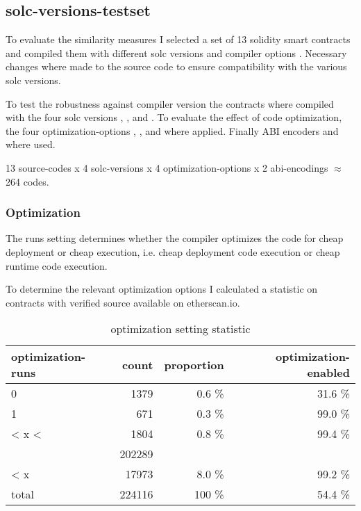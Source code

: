 \documentclass[../main.tex]{subfiles}
\begin{document}
\subsection{solc-versions-testset}
To evaluate the similarity measures I selected a set of 13 solidity smart contracts and compiled
them with different solc versions and compiler options .
Necessary changes where made to the source code to ensure compatibility with the various solc
versions.

To test the robustness against compiler version the contracts where compiled with the four solc versions , ,  and .
To evaluate the effect of code optimization, the four optimization-options , ,  and  where applied.
Finally ABI encoders  and  where used.

13 source-codes x 4 solc-versions x 4 optimization-options x 2 abi-encodings \(\approx\) 264 codes.

\subsubsection{Optimization}
The runs setting determines whether the compiler optimizes the code for cheap deployment or cheap execution, i.e. cheap deployment code execution or cheap runtime code execution.

To determine the relevant optimization options I calculated a statistic  on contracts with verified source available on etherscan.io.

\begin{table*}[ht]
  \centering
  \begin{tabular}{lrrr}
    optimization-runs & count  & proportion           & optimization-enabled \\
    \hline
    0                 & 1379   & 0.6 \%               & 31.6 \%              \\
    1                 & 671    & 0.3 \%               & 99.0 \%              \\
    < x <             & 1804   & 0.8 \%               & 99.4 \%              \\
    \color{red}{200}  & 202289 & \color{red}{90.3 \%} & \color{red}{50.0 \%} \\
    < x               & 17973  & 8.0 \%               & 99.2 \%              \\
    \hline
    total             & 224116 & 100 \%               & 54.4 \%
  \end{tabular}
  \caption{optimization setting statistic}
  \label{tbl:opti_stat}
\end{table*}
\end{document}
